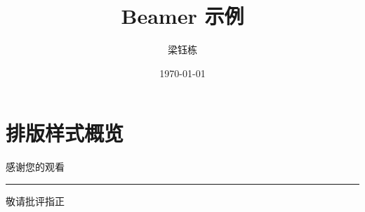 \documentclass[handout, t, aspectratio=169]{ctexbeamer}
\title{Beamer 示例}
\author[iydon]{梁钰栋}
\institute[SUSTech]{南方科技大学}
\date{\today}
\begin{document}
\frame{\titlepage}

\part{排版样式概览}
\frame{\partpage}


\begin{frame}[c]
  \centering
  {\Huge 感谢您的观看\par}
  \vspace{0.50cm}
  {\color{sustech}\rule{1.8cm}{2.4pt}\par}
  \vspace{0.50cm}
  {\Large 敬请批评指正\par}
\end{frame}
\end{document}
